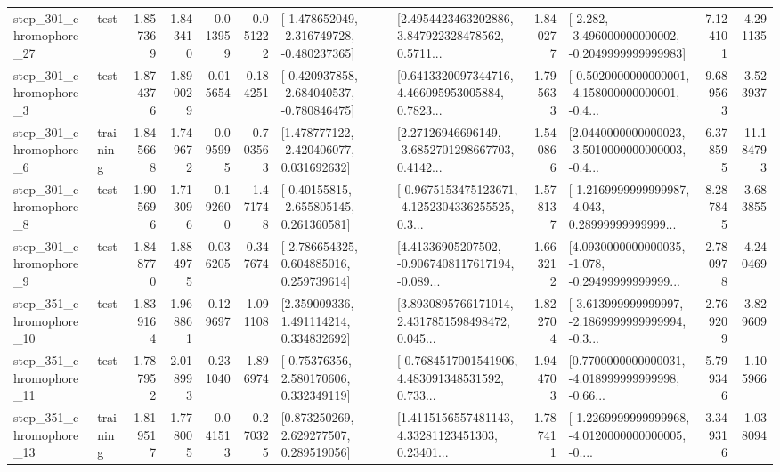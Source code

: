 \begin{tabular}{llrrrrllrlrr}
  step\_301\_chromophore\_27 &      test &      1.857369 &    1.843410 &     -0.013959 & -0.051222 &  [-1.478652049, -2.316749728, -0.480237365] &  [2.4954423463202886, 3.847922328478562, 0.5711... &       1.840277 &  [-2.282, -3.496000000000002, -0.2049999999999983] &            7.124101 &          4.291135 \\
   step\_301\_chromophore\_3 &      test &      1.874376 &    1.890029 &      0.015654 &  0.184251 &  [-0.420937858, -2.684040537, -0.780846475] &  [0.6413320097344716, 4.466095953005884, 0.7823... &       1.795633 &  [-0.5020000000000001, -4.158000000000001, -0.4... &            9.689563 &          3.523937 \\
   step\_301\_chromophore\_6 &  training &      1.845668 &    1.749672 &     -0.095995 & -0.703563 &    [1.478777122, -2.420406077, 0.031692632] &  [2.27126946696149, -3.6852701298667703, 0.4142... &       1.540866 &  [2.0440000000000023, -3.5010000000000003, -0.4... &            6.378595 &         11.184793 \\
   step\_301\_chromophore\_8 &      test &      1.905696 &    1.713096 &     -0.192600 & -1.471748 &    [-0.40155815, -2.655805145, 0.261360581] &  [-0.9675153475123671, -4.1252304336255525, 0.3... &       1.578137 &  [-1.2169999999999987, -4.043, 0.28999999999999... &            8.287845 &          3.683855 \\
   step\_301\_chromophore\_9 &      test &      1.848770 &    1.884975 &      0.036205 &  0.347674 &    [-2.786654325, 0.604885016, 0.259739614] &  [4.41336905207502, -0.9067408117617194, -0.089... &       1.663212 &  [4.0930000000000035, -1.078, -0.29499999999999... &            2.780978 &          4.240469 \\
  step\_351\_chromophore\_10 &      test &      1.839164 &    1.968861 &      0.129697 &  1.091108 &     [2.359009336, 1.491114214, 0.334832692] &  [3.8930895766171014, 2.4317851598498472, 0.045... &       1.822704 &  [-3.613999999999997, -2.1869999999999994, -0.3... &            2.769209 &          3.829609 \\
  step\_351\_chromophore\_11 &      test &      1.787952 &    2.018993 &      0.231040 &  1.896974 &     [-0.75376356, 2.580170606, 0.332349119] &  [-0.7684517001541906, 4.483091348531592, 0.733... &       1.944703 &  [0.7700000000000031, -4.018999999999998, -0.66... &            5.799346 &          1.105966 \\
  step\_351\_chromophore\_13 &  training &      1.819517 &    1.778005 &     -0.041513 & -0.270325 &     [0.873250269, 2.629277507, 0.289519056] &  [1.4115156557481143, 4.33281123451303, 0.23401... &       1.787411 &  [-1.2269999999999968, -4.0120000000000005, -0.... &            3.349316 &          1.038094 \\

\end{tabular}
